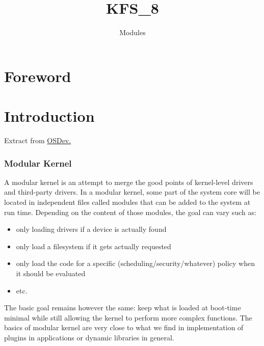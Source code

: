 \documentclass{42-en}
\begin{document}
                           \title{KFS\_8}
                          \subtitle{Modules}


\maketitle

\tableofcontents


\chapter{Foreword}

\chapter{Introduction}
    Extract from \href{http://wiki.osdev.org/Modular_Kernel}{OSDev.}
    \subsection{Modular Kernel}
    A modular kernel is an attempt to merge the good points of kernel-level
    drivers and third-party drivers. In a modular kernel, some part of the
    system core will be located in independent files called modules that can be
    added to the system at run time. Depending on the content of those modules,
    the goal can vary such as:
    \begin{itemize}\itemsep1pt
        \item only loading drivers if a device is actually found
        \item only load a filesystem if it gets actually requested
        \item only load the code for a specific (scheduling/security/whatever)
        policy when it should be evaluated
        \item etc.
    \end{itemize}
    The basic goal remains however the same: keep what is loaded at boot-time
    minimal while still allowing the kernel to perform more complex functions.
    The basics of modular kernel are very close to what we find in
    implementation of plugins in applications or dynamic libraries in general.
\end{document}
